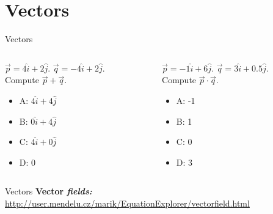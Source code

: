 \documentclass{beamer}
\begin{document}
\section{Vectors}

\begin{frame}{Vectors}
\small
\begin{columns}[T]
\begin{column}{0.5\textwidth}
$\vec{p} = 4\hat{i}+2\hat{j}$.  $\vec{q} = -4\hat{i}+2\hat{j}$.  \\
Compute $\vec{p} + \vec{q}$.
\vspace{0.2cm}
\begin{itemize}
\item A: $4\hat{i}+4\hat{j}$
\item B: $0\hat{i}+4\hat{j}$
\item C: $4\hat{i}+0\hat{j}$
\item D: 0
\end{itemize}
\end{column}
\begin{column}{0.5\textwidth}
$\vec{p} = -1\hat{i}+6\hat{j}$.  $\vec{q} = 3\hat{i}+0.5\hat{j}$.  \\
Compute $\vec{p} \cdot \vec{q}$.
\vspace{0.2cm}
\begin{itemize}
\item A: -1
\item B: 1
\item C: 0
\item D: 3
\end{itemize}
\end{column}
\end{columns}
\end{frame}

\begin{frame}{Vectors}
\textbf{Vector \textit{fields:}} \\
\url{http://user.mendelu.cz/marik/EquationExplorer/vectorfield.html}
\end{frame}
\end{document}
